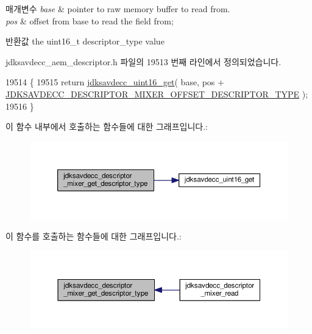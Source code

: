 \begin{DoxyParams}{매개변수}
{\em base} & pointer to raw memory buffer to read from. \\
\hline
{\em pos} & offset from base to read the field from; \\
\hline
\end{DoxyParams}
\begin{DoxyReturn}{반환값}
the uint16\+\_\+t descriptor\+\_\+type value 
\end{DoxyReturn}


jdksavdecc\+\_\+aem\+\_\+descriptor.\+h 파일의 19513 번째 라인에서 정의되었습니다.


\begin{DoxyCode}
19514 \{
19515     \textcolor{keywordflow}{return} \hyperlink{group__endian_ga3fbbbc20be954aa61e039872965b0dc9}{jdksavdecc\_uint16\_get}( base, pos + 
      \hyperlink{group__descriptor__mixer_ga72185bf62008b6194113adbe54b698cd}{JDKSAVDECC\_DESCRIPTOR\_MIXER\_OFFSET\_DESCRIPTOR\_TYPE} );
19516 \}
\end{DoxyCode}


이 함수 내부에서 호출하는 함수들에 대한 그래프입니다.\+:
\nopagebreak
\begin{figure}[H]
\begin{center}
\leavevmode
\includegraphics[width=350pt]{group__descriptor__mixer_gae01356ed1dee84ca0063ea01ccf2a0e7_cgraph}
\end{center}
\end{figure}




이 함수를 호출하는 함수들에 대한 그래프입니다.\+:
\nopagebreak
\begin{figure}[H]
\begin{center}
\leavevmode
\includegraphics[width=350pt]{group__descriptor__mixer_gae01356ed1dee84ca0063ea01ccf2a0e7_icgraph}
\end{center}
\end{figure}


